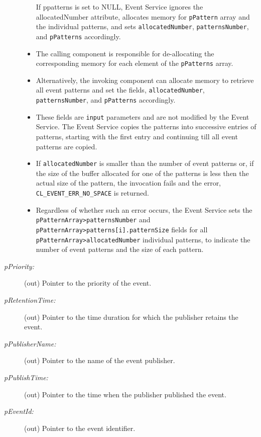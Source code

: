 \begin{flushleft}
\begin{Desc}
\begin{description}
\begin{itemize}
If ppatterns is set to NULL, Event Service ignores the allocatedNumber attribute, allocates memory for {\tt{pPattern}} array and the individual patterns, 
and sets {\tt{allocatedNumber}}, {\tt{patternsNumber}}, and {\tt{pPatterns}} accordingly.
\item
The calling component is responsible for de-allocating the corresponding memory for each element of the {\tt{pPatterns}} array. 
\item
Alternatively, the invoking component can allocate memory to retrieve all event patterns and set the fields, {\tt{allocatedNumber}}, 
{\tt{patternsNumber}}, and {\tt{pPatterns}} accordingly. 
\item
These fields are {\tt{input}} parameters and are not modified by the Event Service. The Event Service copies the patterns into successive entries of
patterns, starting with the first entry and continuing till all event patterns are copied. 
\item
If {\tt{allocatedNumber}} is smaller than the number of event patterns or, if the size of the buffer allocated for one of the patterns is less then the 
actual size of the pattern, the invocation fails and the error, {\tt{CL\_\-EVENT\_\-ERR\_\-NO\_\-SPACE}} is returned. 
\item
Regardless of whether such an error occurs, the Event Service sets the {\tt{pPatternArray>patternsNumber}} and {\tt{pPatternArray>patterns[i].patternSize}} 
fields for all {\tt{pPatternArray>allocatedNumber}} individual patterns, to indicate the number of event patterns and the size of each pattern. 
\end{itemize}

\item[{\em p\-Priority:}](out) Pointer to the priority of the event.

\item[{\em p\-Retention\-Time:}](out) Pointer to the time duration for which the publisher retains the event.

\item[{\em p\-Publisher\-Name:}](out) Pointer to the name of the event publisher.

\item[{\em p\-Publish\-Time:}](out) Pointer to the time when the publisher published the event.

\item[{\em p\-Event\-Id:}](out) Pointer to the event identifier.\end{description}


\end{Desc}
\end{flushleft}
